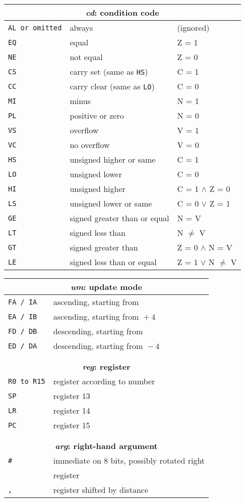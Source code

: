 \documentclass[a4paper,twoside,10pt]{article}
\begin{document}
	\def\code#1#2#3{\texttt{#1} & \small #2 & #3\\}
	
	
	\begin{table}[p!]\centering
				
		
		\begin{tabular}{l@{\hspace{5mm}}ll}
			\multicolumn{3}{c}{\bfseries \emph{cd}: condition code} \\
			\hline
				\code{AL \textrm{or omitted}}{always}{(ignored)}
				\code{EQ}{equal}{Z = 1}
				\code{NE}{not equal}{Z = 0}
				\code{CS}{carry set (same as \texttt{HS})}{C = 1}
				\code{CC}{carry clear (same as \texttt{LO})}{C = 0}
				\code{MI}{minus}{N = 1}
				\code{PL}{positive or zero}{N = 0}
				\code{VS}{overflow}{V = 1}
				\code{VC}{no overflow}{V = 0}
				\code{HS}{unsigned higher or same}{C = 1}
				\code{LO}{unsigned lower}{C = 0}
				\code{HI}{unsigned higher}{C = 1 $\wedge$ Z = 0}
				\code{LS}{unsigned lower or same}{C = 0 $\vee$ Z = 1}
				\code{GE}{signed greater than or equal}{N = V}
				\code{LT}{signed less than}{N $\neq$ V}
				\code{GT}{signed greater than}{Z = 0 $\wedge$ N = V}
				\code{LE}{signed less than or equal}{Z = 1 $\vee$ N $\neq$ V}\hline
				
		\end{tabular}
		\hfill
		\def\code#1#2{\texttt{#1} &\small #2 \\}
		\begin{tabular}{l@{\hspace{5mm}}l}
			\multicolumn{2}{c}{\bfseries \emph{um}: update mode} \\
			\hline
			\code{FA / IA}{ascending, starting from \reg}
			\code{EA / IB}{ascending, starting from \reg ${}+{} 4$}
			\code{FD / DB}{descending, starting from \reg}
			\code{ED / DA}{descending, starting from \reg ${}- 4$}\hline
			&\\
			&\\
			\multicolumn{2}{c}{\bfseries \emph{reg}: register} \\
			\hline
			\code{R0 \textrm{to} R15}{register according to number}
			\code{SP}{register 13}
			\code{LR}{register 14}
			\code{PC}{register 15}\hline
			&\\
			&\\
			\multicolumn{2}{c}{\bfseries \emph{arg}: right-hand argument} \\
			\hline
			\code{\#\imm[8]}{immediate on 8 bits, possibly rotated right}
			\code{\reg}{register}
			\code{\reg, \shift}{register shifted by distance}\hline
		\end{tabular}
				
	\end{table}
	
\end{document}

